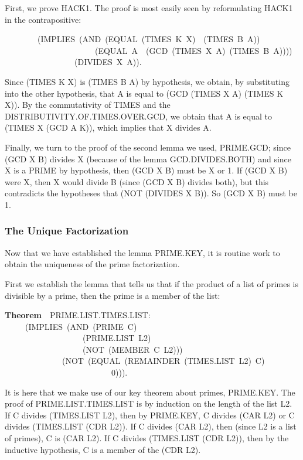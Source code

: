 \documentclass[10pt]{book}
\newenvironment{pubasis}{\begin{flushleft}}{\end{flushleft}}
\newcommand{\axiomordefinition}[1]{\vspace{6pt}\Large\textsf{\textbf{#1}}\normalsize}
\begin{document}
First, we  prove HACK1.  The proof is most easily seen by reformulating
HACK1 in the contrapositive:
\begin{pubasis}
~~~~~~~~(IMPLIES~(AND~(EQUAL~(TIMES~K~X)~~(TIMES~B~A))\\
~~~~~~~~~~~~~~~~~~~~~~(EQUAL~A~~(GCD~(TIMES~X~A)~(TIMES~B~A))))\\
~~~~~~~~~~~~~~~~~(DIVIDES~X~A)).\\
\end{pubasis}
Since (TIMES K X) is (TIMES B A) by hypothesis, we obtain, by substituting into
the other hypothesis, that A is equal to (GCD (TIMES X A) (TIMES K X)).
By the commutativity of TIMES and the DISTRIBUTIVITY.OF.TIMES.OVER.GCD,
we obtain that A is equal to (TIMES X (GCD A K)), which implies that
X divides A.

Finally, we turn to the proof of the second lemma we used, PRIME.GCD; since (GCD X B) divides X (because
of the lemma GCD.DIVIDES.BOTH) and since X is a PRIME by
hypothesis, then (GCD X B) must be X or 1.  If (GCD X B)
were X, then X would divide B (since (GCD X B) divides both),
but this contradicts the hypotheses that (NOT (DIVIDES X B)).
So (GCD X B) must be 1.

\subsubsection{The Unique Factorization}
Now that we have established the lemma PRIME.KEY, it is routine
work to obtain the uniqueness of the prime factorization.

First we establish the lemma that tells us that if the product
of a list of primes is divisible by a prime, then the prime is
a member of the list:

\begin{pubasis}
\axiomordefinition{Theorem}~~PRIME.LIST.TIMES.LIST:\\
~~~~~(IMPLIES~(AND~(PRIME~C)\\
~~~~~~~~~~~~~~~~~~~(PRIME.LIST~L2)\\
~~~~~~~~~~~~~~~~~~~(NOT~(MEMBER~C~L2)))\\
~~~~~~~~~~~~~~(NOT~(EQUAL~(REMAINDER~(TIMES.LIST~L2)~C)\\
~~~~~~~~~~~~~~~~~~~~~~~~~~0))).\\
\end{pubasis}
It is here that  we make use of our key theorem about primes,
PRIME.KEY.
The proof of PRIME.LIST.TIMES.LIST is by induction on the length
of the list L2.  If C divides (TIMES.LIST L2), then by PRIME.KEY, C
divides (CAR L2) or C divides (TIMES.LIST (CDR L2)).  If C divides
(CAR L2), then (since L2 is a list of primes), C
is (CAR L2).  If C divides (TIMES.LIST (CDR  L2)), then by
the inductive hypothesis, C is a member of the (CDR L2).  
\end{document}
